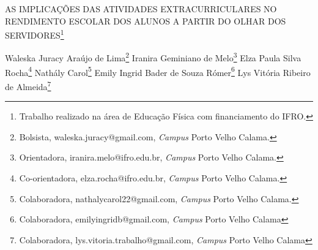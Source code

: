 \documentclass[article,12pt,onesidea,4paper,english,brazil]{abntex2}
\begin{document}
	
	
	\frenchspacing 
	
	\begin{center}
		\LARGE AS IMPLICAÇÕES DAS ATIVIDADES EXTRACURRICULARES NO RENDIMENTO
		ESCOLAR DOS ALUNOS A PARTIR DO OLHAR DOS SERVIDORES\footnote{Trabalho realizado na área de Educação Física com financiamento do IFRO.}
		
		\normalsize
		Waleska Juracy Araújo de Lima\footnote{Bolsista, waleska.juracy@gmail.com, \textit{Campus} Porto Velho Calama.} 
		Iranira Geminiano de Melo\footnote{Orientadora, iranira.melo@ifro.edu.br, \textit{Campus} Porto Velho Calama.} 
		Elza Paula Silva Rocha\footnote{Co-orientadora, elza.rocha@ifro.edu.br, \textit{Campus} Porto Velho Calama.} 
		Nathály Carol\footnote{Colaboradora, nathalycarol22@gmail.com, \textit{Campus} Porto Velho Calama.}
		Emily Ingrid Bader de Souza Rómer\footnote{Colaboradora, emilyingridb@gmail.com, \textit{Campus} Porto Velho Calama}
		Lys Vitória Ribeiro de Almeida\footnote{Colaboradora, lys.vitoria.trabalho@gmail.com, \textit{Campus} Porto Velho Calama} 
	\end{center}
	
\end{document}
